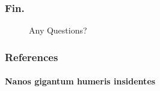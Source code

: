\documentclass[aspectratio=169]{beamer}
\begin{document}
\begin{frame}
	\frametitle{Fin.}
	
	\begin{figure}
		\LARGE
	Any Questions?
	\end{figure}
\end{frame}

\begin{frame}
	\frametitle{References}
	\framesubtitle{Nanos gigantum humeris insidentes}
	
	

\end{frame}
\end{document}
